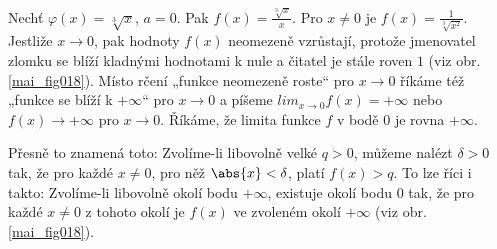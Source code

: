 \wikitextrule
\begin{example}\label{MAI:exam029}
 Nechť \(\varphi(x) = \sqrt[3]{x}\), \(a = 0\). Pak \(f(x) = \frac{\sqrt[3]{x}}{x}\). Pro \(x \neq 
 0\) je \(f(x) = \frac{1}{\sqrt[3]{x^2}}\). Jestliže \(x \to 0\), pak hodnoty \(f(x)\) neomezeně 
 vzrůstají, protože jmenovatel zlomku se blíží kladnými hodnotami k nule a čitatel je stále roven 
 \(1\) (viz obr. \ref{mai_fig018}). Místo rčení „funkce neomezeně roste“ pro \(x \to 0\) říkáme též 
 „funkce se blíží k \(+\infty\)“ pro \(x \to 0\) a píšeme \(lim_{x\to 0} f(x) = +\infty\) nebo 
 \(f(x) \to +\infty\) pro \(x \to 0\). Říkáme, že limita funkce \(f\) v bodě \(0\) je rovna 
 \(+\infty\). 
  
  {\centering
   \captionsetup{type=figure}
   
  \par}
  
  Přesně to znamená toto: Zvolíme-li libovolně velké \(q > 0\), můžeme nalézt \(\delta > 0\) tak, 
  že pro každé \(x \neq 0\), pro něž \(\abs{x} < \delta\), platí \(f(x) > q\). To lze říci i takto: 
  Zvolíme-li libovolně okolí bodu \(+\infty\), existuje okolí bodu \(0\) tak, že pro každé \(x \neq 
  0\) z tohoto okolí je \(f(x)\) ve zvoleném okolí \(+\infty\) (viz obr. \ref{mai_fig018}).
\end{example}















